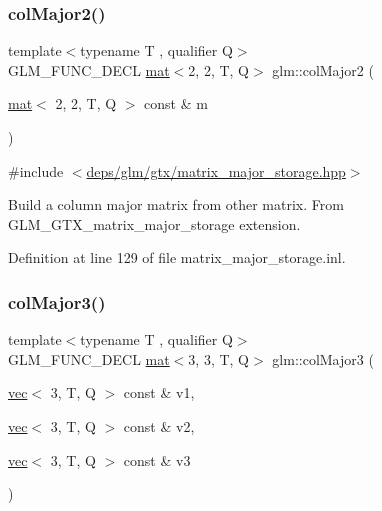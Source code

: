 \subsubsection{\texorpdfstring{col\+Major2()}{colMajor2()}\hspace{0.1cm}{\footnotesize\ttfamily [2/2]}}
{\footnotesize\ttfamily template$<$typename T , qualifier Q$>$ \\
G\+L\+M\+\_\+\+F\+U\+N\+C\+\_\+\+D\+E\+CL \hyperlink{structglm_1_1mat}{mat}$<$2, 2, T, Q$>$ glm\+::col\+Major2 (\begin{DoxyParamCaption}\item[{\hyperlink{structglm_1_1mat}{mat}$<$ 2, 2, T, Q $>$ const \&}]{m }\end{DoxyParamCaption})}



{\ttfamily \#include $<$\hyperlink{matrix__major__storage_8hpp}{deps/glm/gtx/matrix\+\_\+major\+\_\+storage.\+hpp}$>$}

Build a column major matrix from other matrix. From G\+L\+M\+\_\+\+G\+T\+X\+\_\+matrix\+\_\+major\+\_\+storage extension. 

Definition at line 129 of file matrix\+\_\+major\+\_\+storage.\+inl.

\mbox{\label{group__gtx__matrix__major__storage_ga1e25b72b085087740c92f5c70f3b051f}} 
\subsubsection{\texorpdfstring{col\+Major3()}{colMajor3()}\hspace{0.1cm}{\footnotesize\ttfamily [1/2]}}
{\footnotesize\ttfamily template$<$typename T , qualifier Q$>$ \\
G\+L\+M\+\_\+\+F\+U\+N\+C\+\_\+\+D\+E\+CL \hyperlink{structglm_1_1mat}{mat}$<$3, 3, T, Q$>$ glm\+::col\+Major3 (\begin{DoxyParamCaption}\item[{\hyperlink{structglm_1_1vec}{vec}$<$ 3, T, Q $>$ const \&}]{v1,  }\item[{\hyperlink{structglm_1_1vec}{vec}$<$ 3, T, Q $>$ const \&}]{v2,  }\item[{\hyperlink{structglm_1_1vec}{vec}$<$ 3, T, Q $>$ const \&}]{v3 }\end{DoxyParamCaption})}



